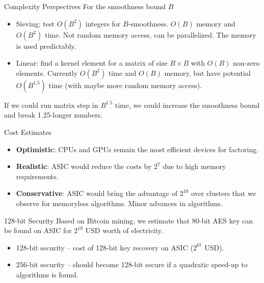 \documentclass[t]{beamer}
\begin{document}
\begin{frame}{Complexity Perspectives}
For the smoothness bound $B$
    \begin{itemize}
        \item Sieving: test  $O(B^2)$ integers   for $B$-smoothness. $O(B)$ memory and $O(B^2)$ time. Not random memory access, can be parallelized. The memory is used predictably. 
        \item Linear: find a kernel element for a matrix of size $B\times B $ with $O(B)$ non-zero elements. Currently $O(B^2)$ time and $O(B)$ memory, but have potential $O(B^{1.5})$ time (with maybe more random memory access).
    \end{itemize}   
   \pause If we could run matrix step in $B^{1.5}$ time, we could increase the smoothness bound and break 1.25-longer numbers.
    
\end{frame}


\begin{frame}{Cost Estimates}
    \begin{itemize}
        \item \textbf{Optimistic}: CPUs  and GPUs remain the most efficient devices for factoring.
        \item \textbf{Realistic}: ASIC would reduce the costs by $2^7$ due to high memory requirements.
        \item \textbf{Conservative}: ASIC would bring the advantage of $2^{10}$ over clusters that we observe for memoryless algorithms. Minor advances in algorithms.
    \end{itemize}
\end{frame}

\begin{frame}{128-bit Security}
    Based on Bitcoin mining, we estimate that 80-bit AES key can be found on ASIC for $2^{19}$ USD worth of electricity.
    \begin{itemize}
        \item 128-bit security -- cost of 128-bit key recovery on ASIC ($2^{67}$ USD).
        \item 256-bit security -- should become 128-bit secure if a quadratic speed-up to algorithms is found.
    \end{itemize}
\end{frame}
\end{document}
